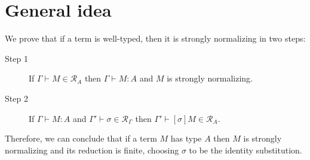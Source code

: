 \documentclass{article}
\newcommand{\ext}[1]{\geq_{#1}}
\newcommand{\SN}{\mathsf{SN}}
\newcommand{\denot}[1]{\mathcal{R}_{#1}}
\newcommand{\inden}[3]{#1 \vdash #2 \in \denot{#3}}
\def\lv{\mathopen{{[\kern-0.14em[}}}    %
\def\rv{\mathclose{{]\kern-0.14em]}}}   %
\newcommand{\den}[1]{\lv #1 \rv}
\begin{document}





\section{General idea}

We prove that if a term is well-typed, then it is strongly normalizing in  two steps:

\begin{description}
\item[Step 1] If $\inden{\Gamma}{M}{A}$ then $\Gamma \vdash M : A$ and $M$ is strongly normalizing.
\item[Step 2] If $\Gamma \vdash M : A$ and $\inden{\Gamma'}{\sigma}{\Gamma}$ then $\inden{\Gamma'}{[\sigma]M}{A}$.
\end{description}

Therefore, we can conclude that if a term $M$ has type $A$ then $M$ is strongly normalizing and its reduction is finite, choosing $\sigma$ to be the identity substitution.


\end{document}
